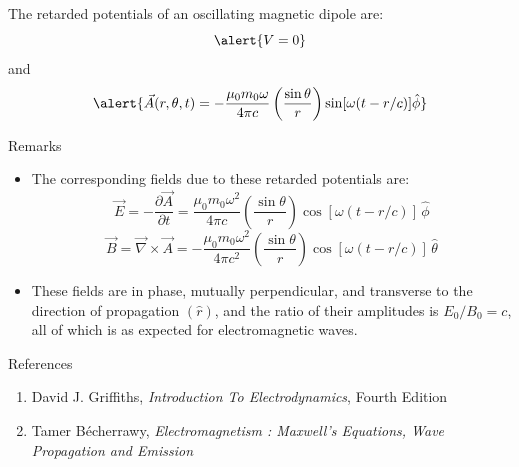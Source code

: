 \documentclass[10pt,aspectratio=169]{beamer}
\begin{document}
\begin{frame}[standout]
		The retarded potentials of an oscillating magnetic dipole are:\pause
		\[ \alert{V = 0}\]\pause
		and
		\[ \alert{\vec{A}(r, \theta, t)=-\frac{\mu_{0} m_{0} \omega}{4 \pi c}\left(\frac{\sin \theta}{r}\right) \sin [\omega(t-r / c)] \hat{\phi}} \]
\end{frame}

\begin{frame}{Remarks}
	\footnotesize
	\begin{itemize}
		\item 		The corresponding fields due to these retarded potentials are:\pause
		\begin{equation}\label{eqn : E}
			\vec{E}=-\frac{\partial \vec{A}}{\partial t}=\frac{\mu_{0} m_{0} \omega^{2}}{4 \pi c}\left(\frac{\sin \theta}{r}\right) \cos [\omega(t-r / c)]\, \hat{\phi}
		\end{equation}\pause
			\begin{equation}\label{eqn : B}
			\vec{B}=\vec{\nabla} \times \vec{A}=-\frac{\mu_{0} m_{0} \omega^{2}}{4 \pi c^{2}}\left(\frac{\sin \theta}{r}\right) \cos [\omega(t-r / c)]\, \hat{\theta}
		\end{equation}
		\pause
		
		\begin{figure}
			\centering
			\label{fig:mag-dip-radn---electromagnetism---tamer}
		\end{figure}\pause
		
		\item 	These fields are in phase, mutually perpendicular, and transverse to the direction of propagation $ \left(\hat{r}\right) $, and the ratio of their amplitudes is $E_0 / B_0 = c$, all of which is as expected for electromagnetic waves.
		
	\end{itemize}
\end{frame}

\begin{frame}{References}
	\begin{enumerate}
		\item 		David J. Griffiths, \emph{Introduction To
			Electrodynamics}, Fourth Edition
		
		\item 		Tamer B{\'e}cherrawy, \emph{Electromagnetism : Maxwell's Equations, Wave Propagation and Emission}
	\end{enumerate}
\end{frame}
\end{document}
